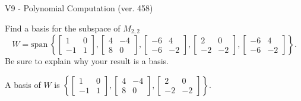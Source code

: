 \begin{exercise}
  \begin{exerciseTitle}V9 - Polynomial Computation (ver. 458)\end{exerciseTitle}
  \begin{exerciseStatement}
    Find a basis for the subspace of \(M_{2,2}\) 
\[W=\mathrm{span}\ \left\{\left[\begin{array}{cc}
1 & 0 \\
-1 & 1
\end{array}\right] , \left[\begin{array}{cc}
4 & -4 \\
8 & 0
\end{array}\right] , \left[\begin{array}{cc}
-6 & 4 \\
-6 & -2
\end{array}\right] , \left[\begin{array}{cc}
2 & 0 \\
-2 & -2
\end{array}\right] , \left[\begin{array}{cc}
-6 & 4 \\
-6 & -2
\end{array}\right]\right\}.\]
 Be sure to explain why your result is a basis.


  \end{exerciseStatement}
  \begin{exerciseAnswer}
   A basis of \(W\) is  \(\left\{\left[\begin{array}{cc}
1 & 0 \\
-1 & 1
\end{array}\right] , \left[\begin{array}{cc}
4 & -4 \\
8 & 0
\end{array}\right] , \left[\begin{array}{cc}
2 & 0 \\
-2 & -2
\end{array}\right]\right\}\).
  


  \end{exerciseAnswer}
\end{exercise}